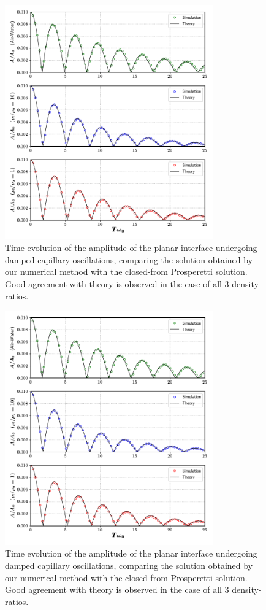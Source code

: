 \begin{figure}[h!]
    \centering
    \includegraphics[width = 0.8\textwidth]{plots/capwave/compare_nonmc.png}
    \caption{Time evolution of the amplitude of the planar interface undergoing damped capillary oscillations, comparing the solution obtained by our numerical method with the closed-from Prosperetti solution. Good agreement with theory is observed in the case of all 3 density-ratios. }
    \label{capwave_nonmc}
\end{figure}

\begin{figure}[h!]
    \centering
    \includegraphics[width = 0.8\textwidth]{plots/capwave/compare_daniel.png}
    \caption{Time evolution of the amplitude of the planar interface undergoing damped capillary oscillations, comparing the solution obtained by our numerical method with the closed-from Prosperetti solution. Good agreement with theory is observed in the case of all 3 density-ratios. }
    \label{capwave_daniel}
\end{figure}

